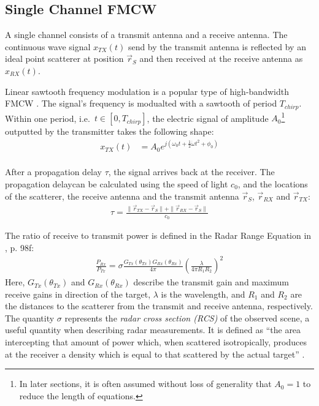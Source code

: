 \subsection{Single Channel FMCW}
\label{ssec:single_channel_fmcw}
A single channel consists of a transmit antenna and a receive antenna.
The continuous wave signal $x_{TX}(t)$ send by the transmit antenna
is reflected by an ideal point scatterer at position $\vec r_S$
and then received at the receive antenna as $x_{RX}(t)$.

Linear sawtooth frequency modulation is a popular type of high-bandwidth FMCW \cite{jankiraman}.
The signal's frequency is modualted with a sawtooth of period $T_{chirp}$.
Within one period, i.e.\ $t \in [0, T_{chirp}]$,
the electric signal of amplitude $A_0$\footnote{
    In later sections, it is often assumed without loss of generality that $A_0=1$ to reduce the length of equations.
} outputted by the transmitter takes the following shape:
\begin{align}
    x_{TX}(t) & = A_0 e^{j(\omega_0t + \frac{1}{2}\dot \omega t^2 + \phi_0)} \label{eqn:x_TX} \\
\end{align}

After a propagation delay $\tau$, the signal arrives back at the receiver.
The propagation delaycan be calculated using the speed of light $c_0$,
and the locations of the scatterer, the receive antenna and the transmit antenna $\vec r_S$,  $\vec r_{RX}$ and $\vec r_{TX}$:
\begin{align}
    \tau = \frac{\| \vec r_{TX} - \vec r_S \|+\| \vec r_{RX} - \vec r_S \|}{c_0}
\end{align}

The ratio of receive to transmit power is defined in the Radar Range Equation in \cite{balanis},  p. 98f:
\begin{align}
    \frac{P_{Rx}}{P_{Tx}} = \sigma \frac{G_{Tx}(\theta_{Tx}) G_{Rx}(\theta_{Rx})}{4\pi} \left(\frac{\lambda}{4\pi R_1 R_2}\right)^2
    \label{eqn:channel_gain}
\end{align}
Here, $G_{Tx}(\theta_{Tx})$ and $G_{Rx}(\theta_{Rx})$ describe the transmit gain and maximum receive gains
in direction of the target, $\lambda$ is the wavelength, and $R_1$ and $R_2$ are the distances to the scatterer
from the transmit and receive antenna, respectively.
The quantity $\sigma$ represents the \emph{radar cross section (RCS)} of the observed scene,
a useful quantity when describing radar measurements.
It is defined as ``the area intercepting that amount of power which,
when scattered isotropically, produces at the receiver a density
which is equal to that scattered by the actual target'' \cite{balanis_engineering_1989}.

